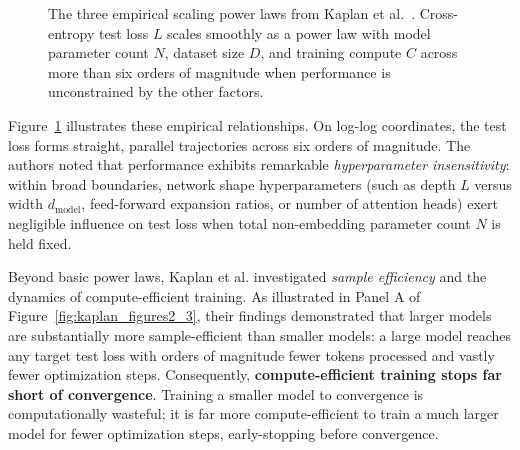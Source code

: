 \documentclass[../../../main.tex]{subfiles}
\begin{document}
\begin{figure}[t]
\caption{The three empirical scaling power laws from Kaplan et al.~\cite{kaplan2020}. Cross-entropy test loss $L$ scales smoothly as a power law with model parameter count $N$, dataset size $D$, and training compute $C$ across more than six orders of magnitude when performance is unconstrained by the other factors.}
\label{fig:kaplan_figure1}
\end{figure}

Figure~\ref{fig:kaplan_figure1} illustrates these empirical relationships. On log-log coordinates, the test loss forms straight, parallel trajectories across six orders of magnitude. The authors noted that performance exhibits remarkable \emph{hyperparameter insensitivity}: within broad boundaries, network shape hyperparameters (such as depth $L$ versus width $d_{\text{model}}$, feed-forward expansion ratios, or number of attention heads) exert negligible influence on test loss when total non-embedding parameter count $N$ is held fixed.

Beyond basic power laws, Kaplan et al. investigated \emph{sample efficiency} and the dynamics of compute-efficient training. As illustrated in Panel A of Figure~\ref{fig:kaplan_figures2_3}, their findings demonstrated that larger models are substantially more sample-efficient than smaller models: a large model reaches any target test loss with orders of magnitude fewer tokens processed and vastly fewer optimization steps. Consequently, \textbf{compute-efficient training stops far short of convergence}. Training a smaller model to convergence is computationally wasteful; it is far more compute-efficient to train a much larger model for fewer optimization steps, early-stopping before convergence.
\end{document}
